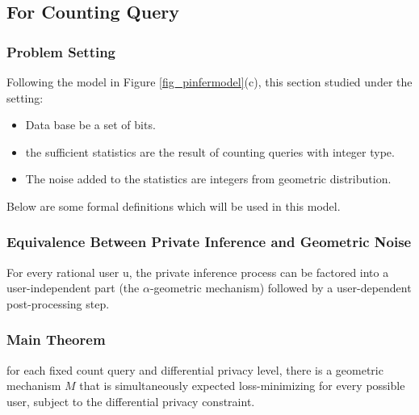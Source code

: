 \documentclass{article}
\begin{document}
\subsection{For Counting Query \texorpdfstring{\cite{ghosh2012universally}}{}}
%

\subsubsection{Problem Setting}
%
Following the model in Figure \ref{fig_pinfermodel}(c), this section studied under the setting:
\begin{itemize}
\item Data base be a set of bits.
\item the sufficient statistics are the result of counting queries with integer type.
\item The noise added to the statistics are integers from geometric distribution.
\end{itemize}
%
Below are some formal definitions which will be used in this model.
%
\begin{definition}
\end{definition}

\begin{definition}
\end{definition}

\begin{definition}
\end{definition}

\subsubsection{Equivalence Between Private Inference and Geometric Noise}
%
For every rational user u,
the private inference process can be factored into a user-independent part
(the $\alpha$-geometric mechanism) followed by a user-dependent post-processing step.

\subsubsection{Main Theorem}
%
\begin{thm}
for each fixed count query and differential privacy level,
there is a geometric mechanism 
$M$ that is simultaneously expected loss-minimizing for every possible user,
subject to the differential privacy constraint.
\end{thm}
\end{document}
